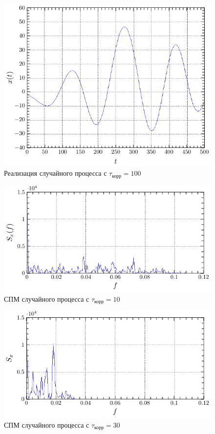 \documentclass[a4paper,14pt]{extarticle}
\begin{document}
\begin{figure}[H]
    \centering
    \includegraphics[width=0.7\linewidth]{fig/x_from_t_100.pdf}
    \vspace{-0.7em}
    \caption{Реализация случайного процесса с $\tau_\text{корр}=100$}
    \label{fig:t100}
\end{figure}

\begin{figure}[H]
    \centering
    \includegraphics[width=0.7\linewidth]{fig/S_from_f_10.pdf}
    \vspace{-0.7em}
    \caption{СПМ случайного процесса с $\tau_\text{корр}=10$}
    \label{fig:s10}
\end{figure}

\begin{figure}[H]
    \centering
    \includegraphics[width=0.7\linewidth]{fig/S_from_f_30.pdf}
    \vspace{-0.7em}
    \caption{СПМ случайного процесса с $\tau_\text{корр}=30$}
    \label{fig:s30}
\end{figure}
\end{document}
